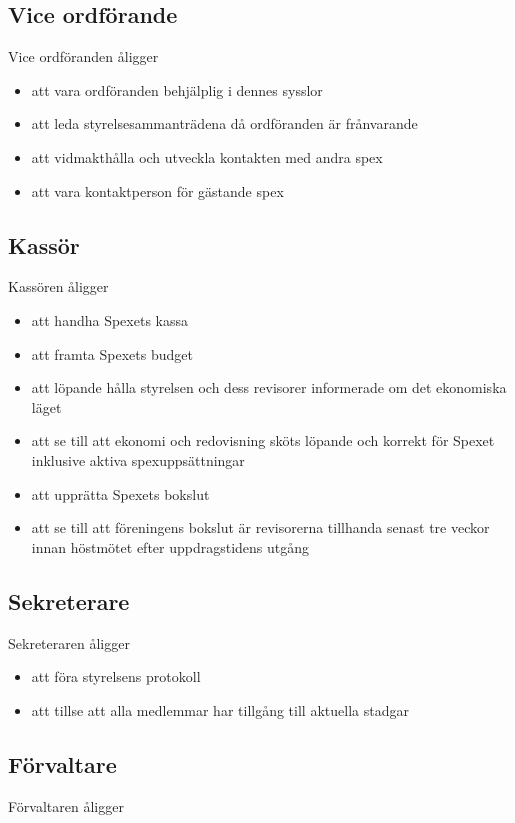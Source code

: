 \documentclass[a4paper]{article}
\begin{document}
\subsection{Vice ordförande}
Vice ordföranden åligger

\begin{itemize}
  \item att vara ordföranden behjälplig i dennes sysslor
  \item att leda styrelsesammanträdena då ordföranden är frånvarande
  \item att vidmakthålla och utveckla kontakten med andra spex
  \item att vara kontaktperson för gästande spex
\end{itemize}

\subsection{Kassör}
Kassören åligger

\begin{itemize}
  \item att handha Spexets kassa
  \item att framta Spexets budget
  \item att löpande hålla styrelsen och dess revisorer informerade om det ekonomiska läget
  \item att se till att ekonomi och redovisning sköts löpande och korrekt för Spexet inklusive aktiva spexuppsättningar
  \item att upprätta Spexets bokslut
  \item att se till att föreningens bokslut är revisorerna tillhanda senast tre veckor innan höstmötet efter uppdragstidens utgång
\end{itemize}

\subsection{Sekreterare}
Sekreteraren åligger

\begin{itemize}
  \item att föra styrelsens protokoll
  \item att tillse att alla medlemmar har tillgång till aktuella stadgar
\end{itemize}

\subsection{Förvaltare}
Förvaltaren åligger
\end{document}
